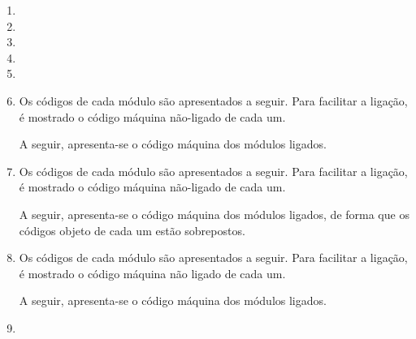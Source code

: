 \begin{enumerate}
    \item
    \item
    \item

    \item 
    
    \item
    \item
    Os códigos de cada módulo são apresentados a seguir.
    Para facilitar a ligação, é mostrado 
    o código máquina não-ligado de cada um.

    A seguir, apresenta-se o código máquina dos módulos ligados.

    \item
    Os códigos de cada módulo são apresentados a seguir.
    Para facilitar a ligação, é mostrado 
    o código máquina não-ligado de cada um.

    A seguir, apresenta-se o código máquina dos módulos ligados,
    de forma que os códigos objeto de cada um estão sobrepostos.

    \item
    Os códigos de cada módulo são apresentados a seguir.
    Para facilitar a ligação, é mostrado 
    o código máquina não ligado de cada um.

    A seguir, apresenta-se o código máquina dos módulos ligados.

    \item
\end{enumerate}